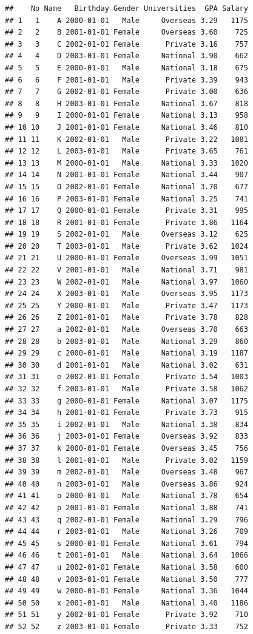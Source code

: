 \documentclass[
]{book}
\begin{document}
\begin{verbatim}
##    No Name   Birthday Gender Universities  GPA Salary
## 1   1    A 2000-01-01   Male     Overseas 3.29   1175
## 2   2    B 2001-01-01 Female     Overseas 3.60    725
## 3   3    C 2002-01-01 Female      Private 3.16    757
## 4   4    D 2003-01-01 Female     National 3.90    662
## 5   5    E 2000-01-01   Male     National 3.18    675
## 6   6    F 2001-01-01   Male      Private 3.39    943
## 7   7    G 2002-01-01 Female      Private 3.00    636
## 8   8    H 2003-01-01 Female     National 3.67    818
## 9   9    I 2000-01-01 Female     National 3.13    958
## 10 10    J 2001-01-01 Female     National 3.46    810
## 11 11    K 2002-01-01   Male      Private 3.22   1081
## 12 12    L 2003-01-01   Male      Private 3.65    761
## 13 13    M 2000-01-01   Male     National 3.33   1020
## 14 14    N 2001-01-01 Female     National 3.44    907
## 15 15    O 2002-01-01 Female     National 3.70    677
## 16 16    P 2003-01-01 Female     National 3.25    741
## 17 17    Q 2000-01-01 Female      Private 3.31    995
## 18 18    R 2001-01-01 Female      Private 3.86   1164
## 19 19    S 2002-01-01   Male     Overseas 3.12    625
## 20 20    T 2003-01-01   Male      Private 3.62   1024
## 21 21    U 2000-01-01 Female     Overseas 3.99   1051
## 22 22    V 2001-01-01   Male     National 3.71    981
## 23 23    W 2002-01-01   Male     National 3.97   1060
## 24 24    X 2003-01-01   Male     Overseas 3.95   1173
## 25 25    Y 2000-01-01   Male      Private 3.47   1173
## 26 26    Z 2001-01-01   Male      Private 3.78    828
## 27 27    a 2002-01-01   Male     Overseas 3.70    663
## 28 28    b 2003-01-01   Male     National 3.29    860
## 29 29    c 2000-01-01   Male     National 3.19   1187
## 30 30    d 2001-01-01   Male     National 3.02    631
## 31 31    e 2002-01-01 Female      Private 3.54   1003
## 32 32    f 2003-01-01   Male      Private 3.58   1062
## 33 33    g 2000-01-01 Female     National 3.07   1175
## 34 34    h 2001-01-01 Female      Private 3.73    915
## 35 35    i 2002-01-01   Male     National 3.38    834
## 36 36    j 2003-01-01 Female     Overseas 3.92    833
## 37 37    k 2000-01-01 Female     Overseas 3.45    756
## 38 38    l 2001-01-01   Male      Private 3.02   1159
## 39 39    m 2002-01-01   Male     Overseas 3.48    967
## 40 40    n 2003-01-01   Male     Overseas 3.86    924
## 41 41    o 2000-01-01   Male     National 3.78    654
## 42 42    p 2001-01-01 Female     National 3.88    741
## 43 43    q 2002-01-01 Female     National 3.29    796
## 44 44    r 2003-01-01   Male     National 3.26    709
## 45 45    s 2000-01-01 Female     National 3.61    794
## 46 46    t 2001-01-01   Male     National 3.64   1066
## 47 47    u 2002-01-01 Female     National 3.58    600
## 48 48    v 2003-01-01 Female     National 3.50    777
## 49 49    w 2000-01-01 Female     National 3.36   1044
## 50 50    x 2001-01-01   Male     National 3.40   1186
## 51 51    y 2002-01-01 Female      Private 3.92    710
## 52 52    z 2003-01-01 Female      Private 3.33    752
\end{verbatim}
\end{document}
